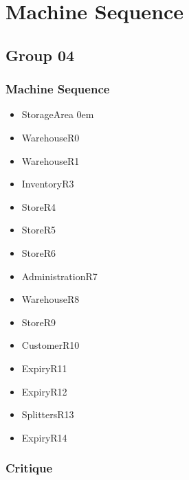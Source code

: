 \section{Machine Sequence}
\label{machinesequence}

\subsection{Group 04}
\label{group04}

\subsubsection{Machine Sequence}
\label{machinesequence}

\begin{itemize}
\item StorageArea
 \itemsep0em 

\item WarehouseR0

\item WarehouseR1

\item InventoryR3

\item StoreR4

\item StoreR5

\item StoreR6

\item AdministrationR7

\item WarehouseR8

\item StoreR9

\item CustomerR10

\item ExpiryR11

\item ExpiryR12

\item SplittersR13

\item ExpiryR14

\end{itemize}

\subsubsection{Critique}
\label{critique}

